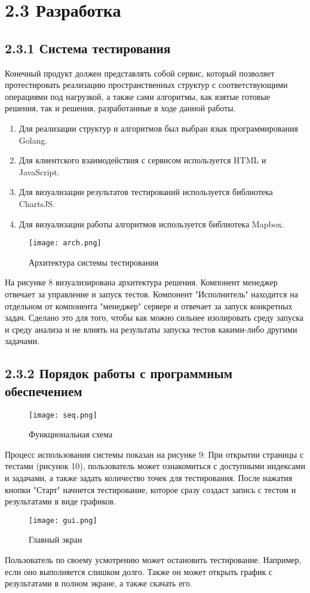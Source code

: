 \section{2.3 Разработка}
\label{cha:development}

\subsection{2.3.1 Система тестирования}
Конечный продукт должен представлять собой сервис, который позволяет протестировать реализацию пространственных структур с соответствующими операциями под нагрузкой, а также сами алгоритмы, как взятые готовые решения, так и решения, разработанные в ходе данной работы. 
\begin{enumerate}
    \item Для реализации структур и алгоритмов был выбран язык программирования Golang.  
    \item Для клиентского взаимодействия с сервисом используется HTML и JavaScript.
    \item Для визуализации результатов тестирований используется библиотека ChartsJS.
    \item Для визуализации работы алгоритмов используется библиотека Mapbox.
\end{enumerate}

\begin{figure}[h]
    \centering
    \texttt{[image: arch.png]}
    \caption{Архитектура системы тестирования}
\end{figure}
На рисунке 8 визуализирована архитектура решения. Компонент менеджер отвечает за управление и запуск тестов. Компонент "Исполнитель" находится на отдельном от компонента "менеджер" сервере и отвечает за запуск конкретных задач. Сделано это для того, чтобы как можно сильнее изолировать среду запуска и среду анализа и не влиять на результаты запуска тестов какими-либо другими задачами. 



\subsection{2.3.2 Порядок работы с программным обеспечением}

\begin{figure}[h]
    \centering
    \texttt{[image: seq.png]}
    \caption{Функциональная схема}
\end{figure}

Процесс использования системы показан на рисунке 9: При открытии страницы с тестами (рисунок 10), пользователь может ознакомиться с доступными индексами и задачами, а также задать количество точек для тестирования. После нажатия кнопки "Старт" начнется тестирование, которое сразу создаст запись с тестом и результатами в виде графиков. 
\begin{figure}[h]
    \centering
    \texttt{[image: gui.png]}
    \caption{Главный экран}
\end{figure}
Пользователь по своему усмотрению может остановить тестирование. Например, если оно выполняется слишком долго. Также он может открыть график с результатами в полном экране, а также скачать его. 

